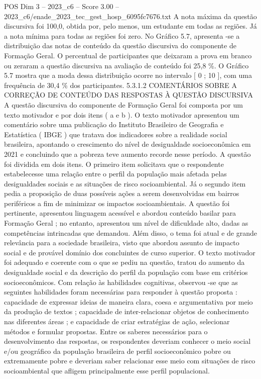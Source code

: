 \begin{textsample}{POS Dim 3 – 2023\_c6 – Score 3.00 – 2023\_c6/enade\_2023\_tec\_gest\_hosp\_6095fc7676.txt}
A nota máxima da questão discursiva foi 100,0, obtida por, pelo menos, um estudante em todas as regiões.
Já a nota mínima para todas as regiões foi zero.
No Gráfico 5.7, apresenta -se a distribuição das notas de conteúdo da questão discursiva do componente de Formação Geral.
O percentual de participantes que deixaram a prova em branco ou zeraram a questão discursiva na avaliação de conteúdo foi 25,8 \%.
O Gráfico 5.7 mostra que a moda dessa distribuição ocorre no intervalo [ 0 ; 10 ], com uma frequência de 30,4 \% dos participantes. 5.3.1.2 COMENTÁRIOS SOBRE A CORREÇÃO DE CONTEÚDO DAS RESPOSTAS À QUESTÃO DISCURSIVA A questão discursiva do componente de Formação Geral foi composta por um texto motivador e por dois itens ( a e b ).
O texto motivador apresentou um comentário sobre uma publicação do Instituto Brasileiro de Geografia e Estatística ( IBGE ) que tratava dos indicadores sobre a realidade social brasileira, apontando o crescimento do nível de desigualdade socioeconômica em 2021 e concluindo que a pobreza teve aumento recorde nesse período.
A questão foi dividida em dois itens.
O primeiro item solicitava que o respondente estabelecesse uma relação entre o perfil da população mais afetada pelas desigualdades sociais e as situações de risco socioambiental.
Já o segundo item pedia a proposição de duas possíveis ações a serem desenvolvidas em bairros periféricos a fim de minimizar os impactos socioambientais.
A questão foi pertinente, apresentou linguagem acessível e abordou conteúdo basilar para Formação Geral ; no entanto, apresentou um nível de dificuldade alto, dadas as competências intrincadas que demandou.
Além disso, o tema foi atual e de grande relevância para a sociedade brasileira, visto que abordou assunto de impacto social e de provável domínio dos concluintes de curso superior.
O texto motivador foi adequado e coerente com o que se pediu na questão, tratou do aumento da desigualdade social e da descrição do perfil da população com base em critérios socioeconômicos.
Com relação às habilidades cognitivas, observou -se que as seguintes habilidades foram necessárias para responder à questão proposta : capacidade de expressar ideias de maneira clara, coesa e argumentativa por meio da produção de textos ; capacidade de inter-relacionar objetos de conhecimento nas diferentes áreas ; e capacidade de criar estratégias de ação, selecionar métodos e formular propostas.
Entre os saberes necessários para o desenvolvimento das respostas, os respondentes deveriam conhecer o meio social e/ou geográfico da população brasileira de perfil socioeconômico pobre ou extremamente pobre e deveriam saber relacionar esse meio com situações de risco socioambiental que afligem principalmente esse perfil populacional.

\end{textsample}

